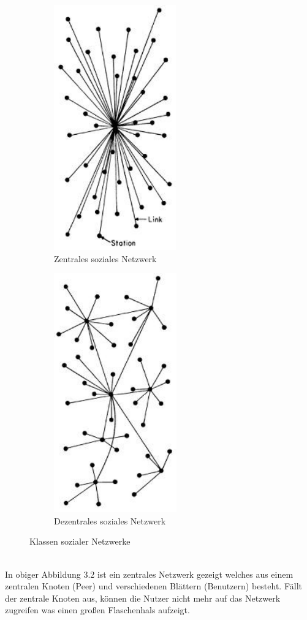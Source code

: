 	\begin{figure}[h] 
		\label{fig:classes-of-networks}
		\centering
		\begin{subfigure}[t]{0.4\linewidth}
			\centering
			\includegraphics[width=0.4\linewidth]{figures/centralized-network.png}
			\caption{Zentrales soziales Netzwerk}
			\label{fig:central-network}
		\end{subfigure}
		\begin{subfigure}[t]{0.4\linewidth}
			\centering
			\includegraphics[width=0.4\linewidth]{figures/decentralized-network.png}
			\caption{Dezentrales soziales Netzwerk}
			\label{fig:decentral-network}
		\end{subfigure}
		\vspace{4pt}
		\caption{Klassen sozialer Netzwerke}
	\end{figure}~\\
	In obiger Abbildung 3.2 ist ein zentrales Netzwerk gezeigt welches aus einem zentralen Knoten (Peer) und verschiedenen Blättern (Benutzern) besteht. Fällt der zentrale Knoten aus, können die Nutzer nicht mehr auf das Netzwerk zugreifen was einen großen Flaschenhals aufzeigt.\\
	
